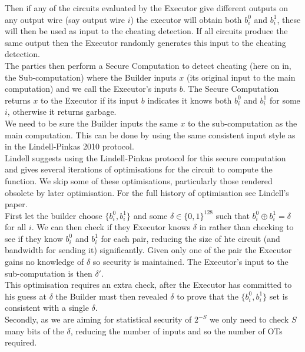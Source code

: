 \documentclass[ %
                    author={Nicholas Tutte},
                supervisor={Prof. Nigel Smart},
                    degree={MEng},
                     title={Secure Two Party Computation},
                  subtitle={A practical comparison of recent protocols},
                      type={Research - GG1K},
                      year={2015} ]{dissertation}
\begin{document}
				Then if any of the circuits evaluated by the Executor give different outputs on any output wire (say output wire $i$) the executor will obtain both $b_i^0$ and $b_i^1$, these will then be used as input to the cheating detection. If all circuits produce the same output then the Executor randomly generates this input to the cheating detection.\\
					
				The parties then perform a Secure Computation to detect cheating (here on in, the Sub-computation) where the Builder inputs $x$ (its original input to the main computation) and  we call the Executor's inputs $b$. The Secure Computation returns $x$ to the Executor if its input $b$ indicates it knows both $b_i^0$ and $b_i^1$ for some $i$, otherwise it returns garbage.\\

				We need to be sure the Builder inputs the same $x$ to the sub-computation as the main computation. This can be done by using the same consistent input style as in the Lindell-Pinkas 2010 protocol.\\

				Lindell suggests using the Lindell-Pinkas protocol for this secure computation and gives several iterations of optimisations for the circuit to compute the function. We skip some of these optimisations, particularly those rendered obsolete by later optimisation. For the full history of optimisation see Lindell's paper.\\

				First let the builder choose $\{b_i^0, b_i^1\}$ and some $\delta \in \{0, 1\}^{128}$ such that $b_i^0 \oplus b_i^1 = \delta$ for all $i$. We can then check if they Executor knows $\delta$ in rather than checking to see if they know $b_i^0$ and $b_i^1$ for each pair, reducing the size of hte circuit (and bandwidth for sending it) significantly. Given only one of the pair the Executor gains no knowledge of $\delta$ so security is maintained. The Executor's input to the sub-computation is then $\delta'$.\\

				This optimisation requires an extra check, after the Executor has committed to his guess at $\delta$ the Builder must then revealed $\delta$ to prove that the $\{b_i^0, b_i^1\}$ set is consistent with a single $\delta$.\\

				Secondly, as we are aiming for statistical security of $2^{-S}$ we only need to check $S$ many bits of the $\delta$, reducing the number of inputs and so the number of OTs required.
\end{document}

